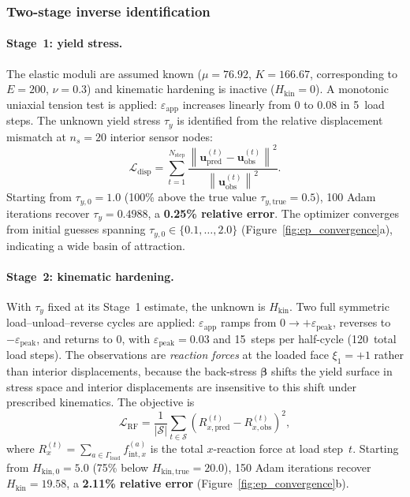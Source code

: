 \documentclass[sort&compress]{svjour3} %
\begin{document}
\subsubsection{Two-stage inverse identification}

\paragraph{Stage~1: yield stress.}
The elastic moduli are assumed known ($\mu=76.92$, $K=166.67$, corresponding to $E=200$, $\nu=0.3$) and kinematic hardening is inactive ($H_{\mathrm{kin}}=0$). A monotonic uniaxial tension test is applied: $\varepsilon_{\mathrm{app}}$ increases linearly from $0$ to $0.08$ in 5~load steps. The unknown yield stress $\tau_y$ is identified from the relative displacement mismatch at $n_s=20$ interior sensor nodes:
\begin{equation}
\mathcal{L}_{\mathrm{disp}} = \sum_{t=1}^{N_{\mathrm{step}}} \frac{\left\|\mathbf{u}^{(t)}_{\mathrm{pred}} - \mathbf{u}^{(t)}_{\mathrm{obs}}\right\|^2}{\left\|\mathbf{u}^{(t)}_{\mathrm{obs}}\right\|^2}.
\label{eq:disp_loss}
\end{equation}
Starting from $\tau_{y,0}=1.0$ (100\% above the true value $\tau_{y,\mathrm{true}}=0.5$), 100 Adam iterations recover $\tau_y=0.4988$, a \textbf{0.25\% relative error}. The optimizer converges from initial guesses spanning $\tau_{y,0}\in\{0.1,\ldots,2.0\}$ (Figure~\ref{fig:ep_convergence}a), indicating a wide basin of attraction.

\paragraph{Stage~2: kinematic hardening.}
With $\tau_y$ fixed at its Stage~1 estimate, the unknown is $H_{\mathrm{kin}}$. Two full symmetric load--unload--reverse cycles are applied: $\varepsilon_{\mathrm{app}}$ ramps from $0\to+\varepsilon_{\mathrm{peak}}$, reverses to $-\varepsilon_{\mathrm{peak}}$, and returns to $0$, with $\varepsilon_{\mathrm{peak}}=0.03$ and 15~steps per half-cycle (120~total load steps). The observations are \emph{reaction forces} at the loaded face $\xi_1=+1$ rather than interior displacements, because the back-stress $\boldsymbol{\beta}$ shifts the yield surface in stress space and interior displacements are insensitive to this shift under prescribed kinematics. The objective is
\begin{equation}
\mathcal{L}_{\mathrm{RF}} = \frac{1}{|\mathcal{S}|}\sum_{t\in\mathcal{S}} \left(R_{x,\mathrm{pred}}^{(t)} - R_{x,\mathrm{obs}}^{(t)}\right)^2,
\label{eq:rf_loss}
\end{equation}
where $R_x^{(t)}=\sum_{a\in\Gamma_{\mathrm{load}}} f_{\mathrm{int},x}^{(a)}$ is the total $x$-reaction force at load step~$t$. Starting from $H_{\mathrm{kin},0}=5.0$ (75\% below $H_{\mathrm{kin,true}}=20.0$), 150 Adam iterations recover $H_{\mathrm{kin}}=19.58$, a \textbf{2.11\% relative error} (Figure~\ref{fig:ep_convergence}b).
\end{document}
